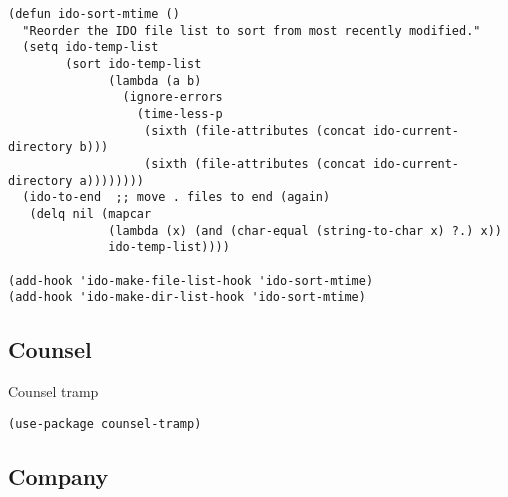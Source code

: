 \documentclass[12pt]{article}
\begin{document}
\begin{verbatim}
(defun ido-sort-mtime ()
  "Reorder the IDO file list to sort from most recently modified."
  (setq ido-temp-list
        (sort ido-temp-list
              (lambda (a b)
                (ignore-errors
                  (time-less-p
                   (sixth (file-attributes (concat ido-current-directory b)))
                   (sixth (file-attributes (concat ido-current-directory a))))))))
  (ido-to-end  ;; move . files to end (again)
   (delq nil (mapcar
              (lambda (x) (and (char-equal (string-to-char x) ?.) x))
              ido-temp-list))))

(add-hook 'ido-make-file-list-hook 'ido-sort-mtime)
(add-hook 'ido-make-dir-list-hook 'ido-sort-mtime)

\end{verbatim}

\subsection{Counsel}
\label{sec:org1644d64}
Counsel tramp
\begin{verbatim}
(use-package counsel-tramp)
\end{verbatim}

\subsection{Company}
\label{sec:org6bb5354}
\end{document}
